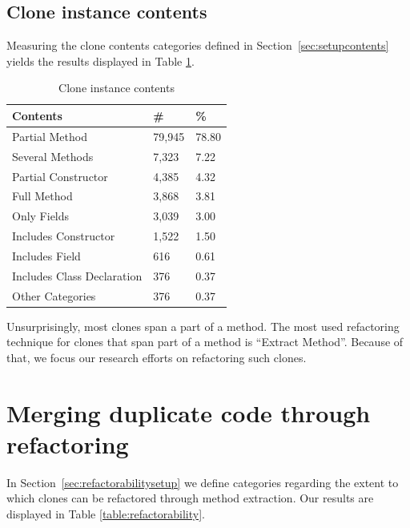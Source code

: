 \subsection{Clone instance contents}\label{chap:clonecontents}
Measuring the clone contents categories defined in Section~\ref{sec:setupcontents} yields the results displayed in Table \ref{table:contents}.

\begin{table}[H]
  \begin{center}
  \caption{Clone instance contents} \label{table:contents}
  \medskip
\begin{tabular}{|l|l|l|}
  \hline
  \textbf{Contents} & \textbf{\#} & \textbf{\%} \\ \hline
  Partial Method     & 79,945 & 78.80 \\ \hline
  Several Methods         & 7,323 & 7.22 \\ \hline
  Partial Constructor      & 4,385 & 4.32 \\ \hline
  Full Method           & 3,868 & 3.81 \\ \hline
  Only Fields           & 3,039 & 3.00 \\ \hline
  Includes Constructor  & 1,522 & 1.50 \\ \hline
  Includes Field        & 616 & 0.61 \\ \hline
  Includes Class Declaration  & 376 & 0.37 \\ \hline
  Other Categories    & 376 & 0.37\\ \hline
\end{tabular}
\end{center}
\end{table}

Unsurprisingly, most clones span a part of a method. The most used refactoring technique for clones that span part of a method is ``Extract Method''. Because of that, we focus our research efforts on refactoring such clones.

\section{Merging duplicate code through refactoring} \label{sec:refactorability}
In Section~\ref{sec:refactorabilitysetup} we define categories regarding the extent to which clones can be refactored through method extraction. Our results are displayed in Table \ref{table:refactorability}.

